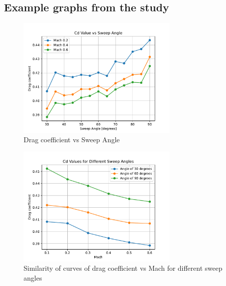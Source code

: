 \documentclass{article}
\begin{document}
\subsection{Example graphs from the study}

\begin{figure}[H]
    \centering
    \includegraphics[width=0.7\textwidth]{../data/R6-Parametric-Fins/CDvsSweep.pdf}
    \caption{Drag coefficient vs Sweep Angle}
    \label{fig:CdVsSweep}
\end{figure}

\begin{figure}[H]
    \centering
    \includegraphics[width=0.7\textwidth]{../data/R6-Parametric-Fins/CDvsMach.pdf}
    \caption{Similarity of curves of drag coefficient vs Mach for different sweep angles}
\end{figure}
\end{document}
